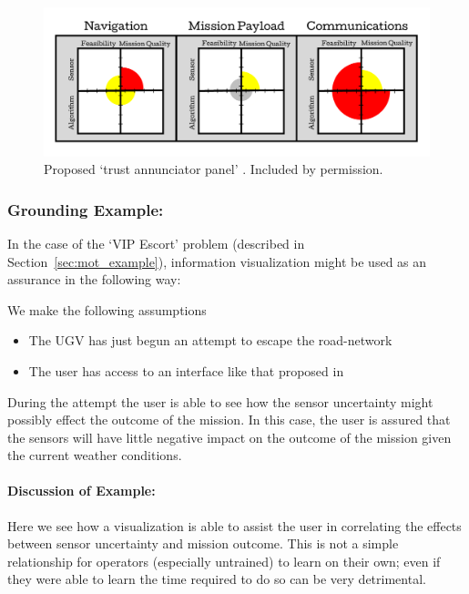 \begin{figure}[htpb]
    \centering
    \includegraphics[width=0.9\linewidth]{Figures/Hutchins_fig.pdf}
    \caption{Proposed `trust annunciator panel' \cite{Hutchins2015-if}. Included by permission.}
    \label{fig:hutchins_fig}
\end{figure}

\subsubsection{Grounding Example:}
In the case of the `VIP Escort' problem (described in Section~\ref{sec:mot_example}), information visualization might be used as an assurance in the following way:

We make the following assumptions

\begin{itemize}
    \item The UGV has just begun an attempt to escape the road-network
    \item The user has access to an interface like that proposed in \cite{Hutchins2015-if}
\end{itemize}

During the attempt the user is able to see how the sensor uncertainty might possibly effect the outcome of the mission. In this case, the user is assured that the sensors will have little negative impact on the outcome of the mission given the current weather conditions.

\paragraph{\textbf{Discussion of Example:}} Here we see how a visualization is able to assist the user in correlating the effects between sensor uncertainty and mission outcome. This is not a simple relationship for operators (especially untrained) to learn on their own; even if they were able to learn the time required to do so can be very detrimental.
